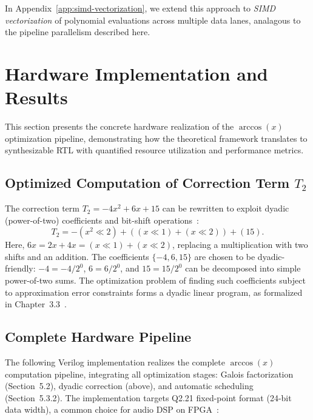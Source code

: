 In Appendix~\ref{app:simd-vectorization}, we extend this approach to \emph{SIMD vectorization} of polynomial evaluations across multiple data lanes, analagous to the pipeline parallelism described here.

\section{Hardware Implementation and Results}
\label{sec:hardware_opt}

This section presents the concrete hardware realization of the $\arccos(x)$ optimization pipeline, demonstrating how the theoretical framework translates to synthesizable RTL with quantified resource utilization and performance metrics.

\subsection{Optimized Computation of Correction Term $T_2$}

The correction term $T_2 = -4x^2 + 6x + 15$ can be rewritten to exploit dyadic (power-of-two) coefficients and bit-shift operations~\cite{Muller2006,Abdi2024}:
\begin{equation}
T_2 = -(x^2 \ll 2) + ((x \ll 1) + (x \ll 2)) + (15). \label{eq:t2_optimized}
\end{equation}
Here, $6x = 2x + 4x = (x \ll 1) + (x \ll 2)$, replacing a multiplication with two shifts and an addition. The coefficients $\{-4, 6, 15\}$ are chosen to be dyadic-friendly: $-4 = -4/2^0$, $6 = 6/2^0$, and $15 = 15/2^0$ can be decomposed into simple power-of-two sums. The optimization problem of finding such coefficients subject to approximation error constraints forms a dyadic linear program, as formalized in Chapter~3.3~\cite{Abdi2024}.

\subsection{Complete Hardware Pipeline}

The following Verilog implementation realizes the complete $\arccos(x)$ computation pipeline, integrating all optimization stages: Galois factorization (Section~5.2), dyadic correction (above), and automatic scheduling (Section~5.3.2). The implementation targets Q2.21 fixed-point format (24-bit data width), a common choice for audio DSP on FPGA~\cite{Syfala2024}:


